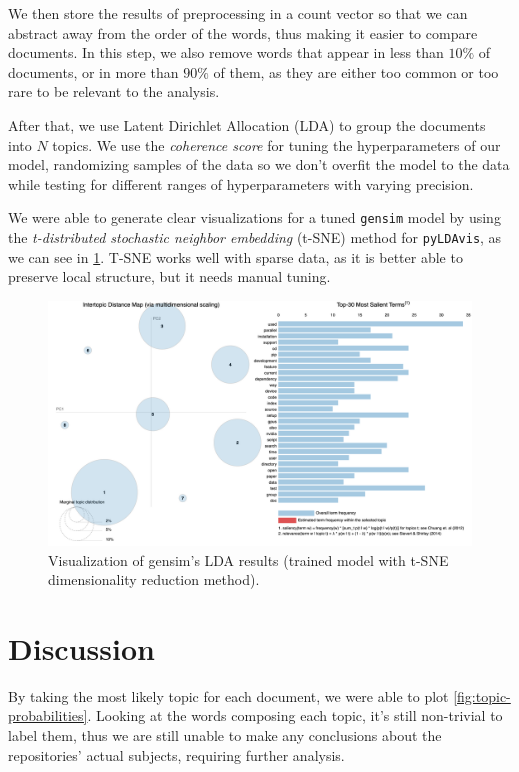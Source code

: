 \documentclass[12pt]{article}
\begin{document}
We then store the results of preprocessing in a count vector so that we can
abstract away from the order of the words, thus making it easier to compare
documents.
In this step, we also remove words that appear in less than $10\%$
of documents, or in more than $90\%$ of them, as they are either
too common or too rare to be relevant to the analysis.

After that, we use Latent Dirichlet Allocation (LDA) to group the documents
into $N$ topics.
We use the \textit{coherence score} for tuning the hyperparameters of our
model, randomizing samples of the data so we don't overfit the model to the data
while testing for different ranges of hyperparameters with varying precision.

We were able to generate clear visualizations for a tuned \verb|gensim| model by using the
\textit{t-distributed stochastic neighbor embedding} (t-SNE) method for
\verb|pyLDAvis|, as we can see in
\ref{fig:lda_gensim_tsne}.
T-SNE works well with sparse data, as it is better able to preserve local
structure, but it needs manual tuning.

\begin{figure}[ht]
    \centering
    \includegraphics[width=\linewidth]{gensim-tsne.png}
    \caption{Visualization of gensim's LDA results (trained model with t-SNE
        dimensionality reduction method).}
    \label{fig:lda_gensim_tsne}
\end{figure}

\section{Discussion} \label{sec:discussion}

By taking the most likely topic for each document, we were able to plot
\ref{fig:topic-probabilities}.
Looking at the words composing each topic, it's still non-trivial to label
them, thus we are still unable to make any conclusions about the
repositories' actual subjects, requiring further analysis.
\end{document}
